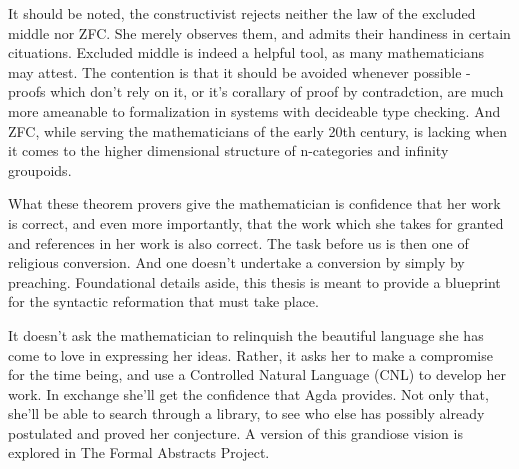 It should be noted, the constructivist rejects neither the law of the excluded
middle nor ZFC. She merely observes them, and admits their handiness in certain
cituations. Excluded middle is indeed a helpful tool, as many mathematicians
may attest. The contention is that it should be avoided whenever possible -
proofs which don't rely on it, or it's corallary of proof by contradction, are
much more ameanable to formalization in systems with decideable type checking.
And ZFC, while serving the mathematicians of the early 20th century, is 
lacking when it comes to the higher dimensional structure of n-categories and
infinity groupoids.

What these theorem provers give the mathematician is confidence that her work
is correct, and even more importantly, that the work which she takes for
granted and references in her work is also correct. The task before us is then
one of religious conversion. And one doesn't undertake a conversion by simply
by preaching. Foundational details aside, this thesis is meant to provide a
blueprint for the syntactic reformation that must take place.  

It doesn't ask the mathematician to relinquish the beautiful language she has
come to love in expressing her ideas.  Rather, it asks her to make a compromise
for the time being, and use a Controlled Natural Language (CNL) to develop her
work. In exchange she'll get the confidence that Agda provides. Not only that,
she'll be able to search through a library, to see who else has possibly
already postulated and proved her conjecture. A version of this grandiose vision is 
explored in The Formal Abstracts Project.

